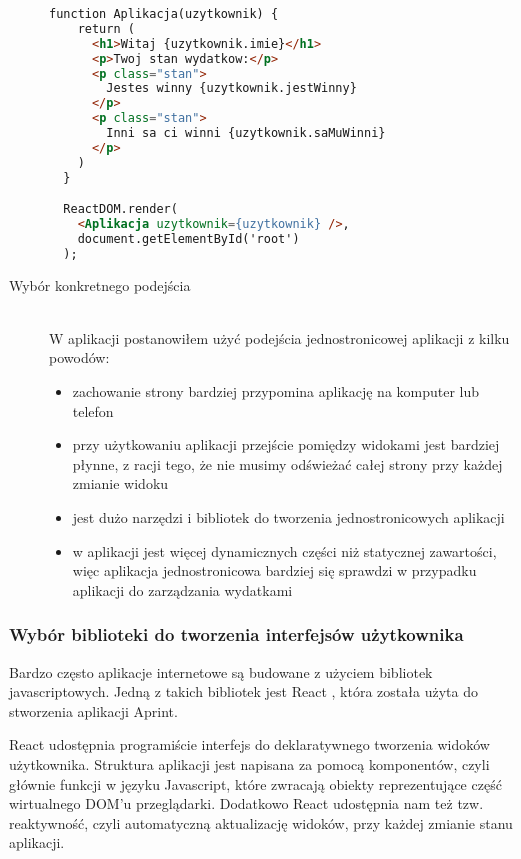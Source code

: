 \begin{description}
  \begin{lstlisting}[language=HTML, caption=Przykład aplikacji z użyciem biblioteki Javascriptowej, label={lst:reactCode}]
  function Aplikacja(uzytkownik) {
    return (
      <h1>Witaj {uzytkownik.imie}</h1>
      <p>Twoj stan wydatkow:</p>
      <p class="stan">
        Jestes winny {uzytkownik.jestWinny}
      </p>
      <p class="stan">
        Inni sa ci winni {uzytkownik.saMuWinni}
      </p>
    )
  }

  ReactDOM.render(
    <Aplikacja uzytkownik={uzytkownik} />,
    document.getElementById('root')
  );
  \end{lstlisting}
  \item[Wybór konkretnego podejścia] \hfill \\ W aplikacji postanowiłem użyć podejścia jednostronicowej aplikacji z kilku powodów:
  \begin{itemize}
    \item zachowanie strony bardziej przypomina aplikację na komputer lub telefon
    \item przy użytkowaniu aplikacji przejście pomiędzy widokami jest bardziej płynne, z racji tego, że nie musimy odświeżać całej strony przy każdej zmianie widoku
    \item jest dużo narzędzi i bibliotek do tworzenia jednostronicowych aplikacji
    \item w aplikacji jest więcej dynamicznych części niż statycznej zawartości, więc aplikacja jednostronicowa bardziej się sprawdzi w przypadku aplikacji do zarządzania wydatkami
  \end{itemize}
\end{description}

\subsubsection{Wybór biblioteki do tworzenia interfejsów użytkownika}
Bardzo często aplikacje internetowe są budowane z użyciem bibliotek javascriptowych. Jedną z takich bibliotek jest React \cite{ref_react_doc}, która została użyta do stworzenia aplikacji Aprint.

React udostępnia programiście interfejs do deklaratywnego tworzenia widoków użytkownika. Struktura aplikacji jest napisana za pomocą komponentów, czyli głównie funkcji w języku Javascript, które zwracają obiekty reprezentujące część wirtualnego DOM'u przeglądarki. Dodatkowo React udostępnia nam też tzw. reaktywność, czyli automatyczną aktualizację widoków, przy każdej zmianie stanu aplikacji.

